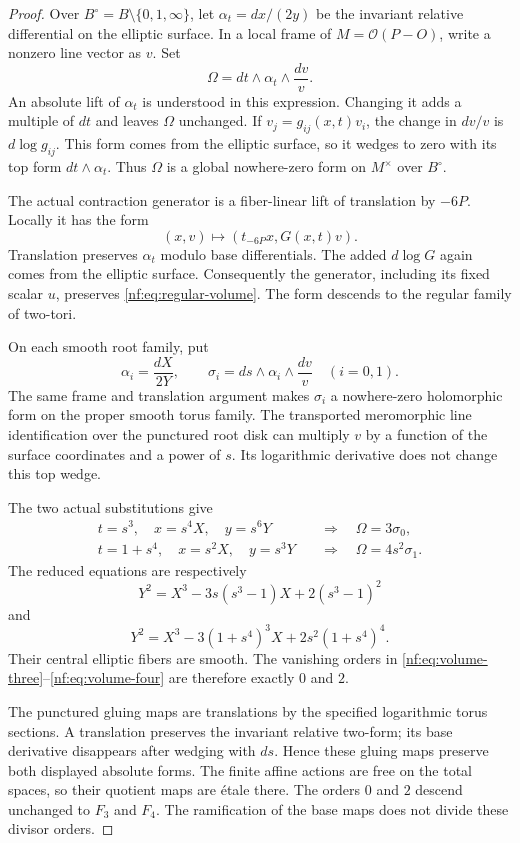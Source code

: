 \begin{proof}
Over $B^\circ=B\setminus\{0,1,\infty\}$, let
$\alpha_t=dx/(2y)$ be the invariant relative differential on the
elliptic surface. In a local frame of $M=\mathcal O(P-O)$, write a
nonzero line vector as $v$. Set
\begin{equation}\label{nf:eq:regular-volume}
 \Omega=dt\wedge\alpha_t\wedge\frac{dv}{v}.
\end{equation}
An absolute lift of $\alpha_t$ is understood in this expression.
Changing it adds a multiple of $dt$ and leaves $\Omega$ unchanged.
If $v_j=g_{ij}(x,t)v_i$, the change in $dv/v$ is $d\log g_{ij}$.
This form comes from the elliptic surface, so it wedges to zero
with its top form $dt\wedge\alpha_t$. Thus $\Omega$ is a global
nowhere-zero form on $M^\times$ over $B^\circ$.

The actual contraction generator is a fiber-linear lift of
translation by $-6P$. Locally it has the form
\[
 (x,v)\longmapsto(t_{-6P}x,G(x,t)v).
\]
Translation preserves $\alpha_t$ modulo base differentials.
The added $d\log G$ again comes from the elliptic surface.
Consequently the generator, including its fixed scalar $u$,
preserves \eqref{nf:eq:regular-volume}. The form descends to the
regular family of two-tori.

On each smooth root family, put
\[
 \alpha_i=\frac{dX}{2Y},\qquad
 \sigma_i=ds\wedge\alpha_i\wedge\frac{dv}{v}
 \quad(i=0,1).
\]
The same frame and translation argument makes $\sigma_i$ a
nowhere-zero holomorphic form on the proper smooth torus family.
The transported meromorphic line identification over the punctured
root disk can multiply $v$ by a function of the surface coordinates
and a power of $s$. Its logarithmic derivative does not change this
top wedge.

The two actual substitutions give
\begin{align}
 t=s^3,\quad x=s^4X,\quad y=s^6Y
 &\quad\Longrightarrow\quad
 \Omega=3\sigma_0, \label{nf:eq:volume-three}\\
 t=1+s^4,\quad x=s^2X,\quad y=s^3Y
 &\quad\Longrightarrow\quad
 \Omega=4s^2\sigma_1. \label{nf:eq:volume-four}
\end{align}
The reduced equations are respectively
\[
 Y^2=X^3-3s(s^3-1)X+2(s^3-1)^2
\]
and
\[
 Y^2=X^3-3(1+s^4)^3X+2s^2(1+s^4)^4.
\]
Their central elliptic fibers are smooth. The vanishing orders in
\eqref{nf:eq:volume-three}--\eqref{nf:eq:volume-four} are therefore
exactly $0$ and $2$.

The punctured gluing maps are translations by the specified
logarithmic torus sections. A translation preserves the invariant
relative two-form; its base derivative disappears after wedging
with $ds$. Hence these gluing maps preserve both displayed absolute
forms. The finite affine actions are free on the total spaces, so
their quotient maps are \'{e}tale there. The orders $0$ and $2$
descend unchanged to $F_3$ and $F_4$. The ramification of the base
maps does not divide these divisor orders.


\end{proof}
